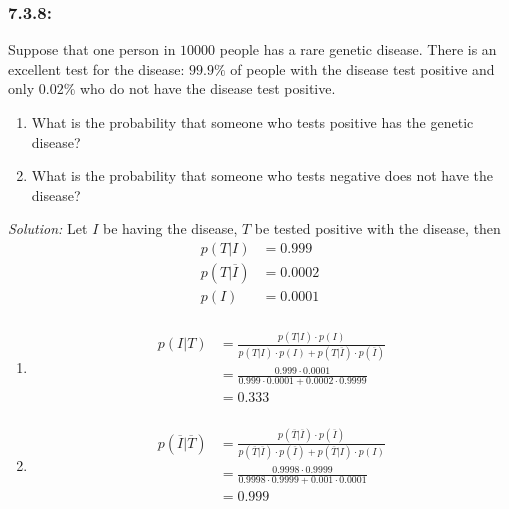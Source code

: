 \documentclass[a4paper]{article}
\begin{document}
	\subsubsection*{7.3.8:}
	Suppose that one person in $10000$ people has a rare genetic disease. There is an excellent test for the disease: $99.9\%$ of people with the disease test positive and only $0.02\%$ who do not have the disease test positive.
	\begin{enumerate}[label = \textbf{\alph*)}]
		\item What is the probability that someone who tests positive has the genetic disease?
		\item What is the probability that someone who tests negative does not have the disease?
	\end{enumerate}
	\emph{Solution:} 
	Let $I$ be having the disease, $T$ be tested positive with the disease, then
	\begin{align*}
		p(T|I) & = 0.999 \\
		p(T|\overline{I}) & = 0.0002 \\
		p(I) & = 0.0001 \\
	\end{align*}
	\begin{enumerate}[label = \textbf{\alph*)}]
		\item 
		\begin{align*}
			p(I|T) & = \frac{p(T|I) \cdot p(I)}{p(T|I) \cdot p(I) + p(T|\overline{I}) \cdot p(\overline{I})} \\
			& = \frac{0.999 \cdot 0.0001}{0.999 \cdot 0.0001 + 0.0002 \cdot 0.9999} \\
			& = 0.333 \\
		\end{align*}
		\item 
		\begin{align*}
			p(\overline{I}|\overline{T}) & = \frac{p(\overline{T}|\overline{I}) \cdot p(\overline{I})}{p(\overline{T}|\overline{I}) \cdot p(\overline{I}) + p(\overline{T}|I) \cdot p(I)} \\
			& = \frac{0.9998 \cdot 0.9999}{0.9998 \cdot 0.9999 + 0.001 \cdot 0.0001} \\
			& = 0.999 \\
		\end{align*}
	\end{enumerate}
	
\end{document}
